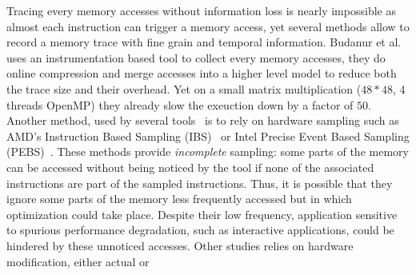 Tracing every memory accesses without information loss is nearly impossible as
almost each instruction can trigger a memory access, yet several methods
allow to record a memory trace with fine grain and temporal information.
%
Budanur et al.~\cite{Budanur11Memory} uses an instrumentation based tool to
collect every memory accesses, they do online compression and merge accesses
into a higher level model to reduce both the trace size and their overhead.
Yet on a small matrix multiplication ($48*48$, 4 threads OpenMP) they already
slow the exeuction down by a factor of $50$.
Another method, used by several
tools~\cite{Lachaize12MemProf,McCurdy10Memphis,Liu14Tool,Gimenez14Dissecting}
is to rely on hardware sampling such as AMD's Instruction Based Sampling
(IBS)~\cite{Drongowski07Instructionbased} or Intel Precise Event Based
Sampling (PEBS)~\cite{Levinthal2009}.  These methods provide \emph{incomplete}
sampling: some parts of the memory can be accessed without being noticed by
the tool if none of the associated instructions are part of the sampled
instructions.  Thus, it is possible that they ignore some parts of the memory
less frequently accessed but in which optimization could take place.  Despite
their low frequency, application sensitive to spurious performance
degradation, such as interactive applications, could be hindered by these
unnoticed accesses.
%
%
Other studies relies on hardware modification, either actual or
